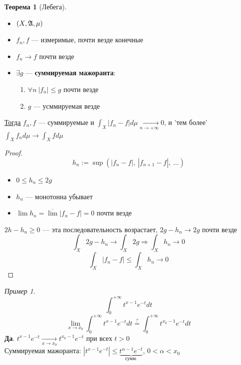 \documentclass[oneside]{book}
\theoremstyle{plain}
\theoremstyle{remark}
\newtheorem*{examp}{Пример}
\theoremstyle{definition}
\newtheorem{theorem}{Теорема}[section]
\begin{document}
\begin{theorem}[Лебега]
\-
\begin{itemize}
\item \((X, \mathfrak{A}, \mu)\)
\item \(f_n, f\) --- измеримые, почти везде конечные
\item \(f_n \to f\) почти везде
\item \(\exists g\) --- \textbf{суммируемая мажоранта}:
\begin{enumerate}
\item \label{lebega_1} \(\forall n\ |f_n| \le g\) почти везде
\item \(g\) --- усммируемая везде
\end{enumerate}
\end{itemize}
\uline{Тогда} \(f_n, f\) --- суммируемые и \(\int_X |f_n - f|d\mu\xrightarrow[n \to + \infty]{}0\), и 'тем более' \(\int_X f_n d\mu \to \int_X f d\mu\)
\end{theorem}
\begin{proof}
\[ h_n := \sup(|f_n - f|,\ |f_{n + 1} - f|,\ \dots) \]
\begin{itemize}
\item \(0 \le h_n \le 2g\)
\item \(h_n\) --- монотонна убывает
\item \(\lim h_n = \overline{\lim}|f_n - f| = 0\) почти везде
\end{itemize}
\(2h - h_n \ge 0\) --- эта последовательность возрастает, \(2g - h_n \to 2g\) почти везде
\[ \int_X 2g - h_n \to \int_X 2g \Rightarrow \int_X h_n \to 0 \]
\[ \int_X|f_n -f| \le \int_X h_n \to 0 \]
\end{proof}
\begin{examp}
\[ \int_0^{ + \infty} t^{x - 1}e^{-t} dt \]
\[ \lim_{x \to x_0} \int_0^{ + \infty} t^{x - 1} e^{-t} dt \overset{?}{=} \int_0^{ + \infty}t^{x_0 - 1}e^{-t} dt\]
\textbf{Да}. \(t^{x - 1} e^{-t} \xrightarrow[x \to x_0]{} t^{x_0 - 1}e^{-t}\) при всех \(t>0\) \\
Суммируемая мажоранта: \(|t^{x - 1}e^{-t}| \le \underbrace{t^{\alpha - 1}e^{-t}}_\text{сумм.}\), \(0 < \alpha < x_0\)
\end{examp}
\end{document}
